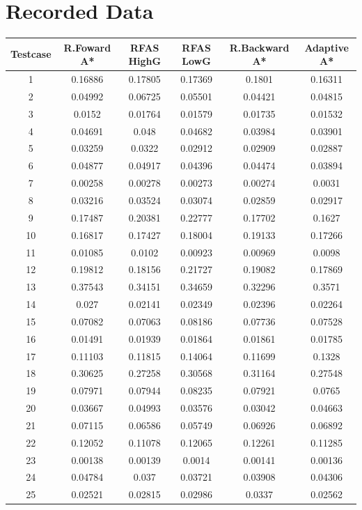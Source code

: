 \documentclass[12pt]{article}
\begin{document}
	\onecolumn
	\section*{Recorded Data}
		\begin{table}[!htb]
			\centering
			\begin{tabular}{|c|c|c|c|c|c|}
				Testcase & R.Foward A* &  RFAS HighG & RFAS LowG & R.Backward A* & Adaptive A*\\\hline
				1&0.16886&0.17805&0.17369&0.1801&0.16311\\
				2&0.04992&0.06725&0.05501&0.04421&0.04815\\
				3&0.0152&0.01764&0.01579&0.01735&0.01532\\
				4&0.04691&0.048&0.04682&0.03984&0.03901\\
				5&0.03259&0.0322&0.02912&0.02909&0.02887\\
				6&0.04877&0.04917&0.04396&0.04474&0.03894\\
				7&0.00258&0.00278&0.00273&0.00274&0.0031\\
				8&0.03216&0.03524&0.03074&0.02859&0.02917\\
				9&0.17487&0.20381&0.22777&0.17702&0.1627\\
				10&0.16817&0.17427&0.18004&0.19133&0.17266\\
				11&0.01085&0.0102&0.00923&0.00969&0.0098\\
				12&0.19812&0.18156&0.21727&0.19082&0.17869\\
				13&0.37543&0.34151&0.34659&0.32296&0.3571\\
				14&0.027&0.02141&0.02349&0.02396&0.02264\\
				15&0.07082&0.07063&0.08186&0.07736&0.07528\\
				16&0.01491&0.01939&0.01864&0.01861&0.01785\\
				17&0.11103&0.11815&0.14064&0.11699&0.1328\\
				18&0.30625&0.27258&0.30568&0.31164&0.27548\\
				19&0.07971&0.07944&0.08235&0.07921&0.0765\\
				20&0.03667&0.04993&0.03576&0.03042&0.04663\\
				21&0.07115&0.06586&0.05749&0.06926&0.06892\\
				22&0.12052&0.11078&0.12065&0.12261&0.11285\\
				23&0.00138&0.00139&0.0014&0.00141&0.00136\\
				24&0.04784&0.037&0.03721&0.03908&0.04306\\
				25&0.02521&0.02815&0.02986&0.0337&0.02562\\
			\end{tabular}
		\end{table}
\end{document}
